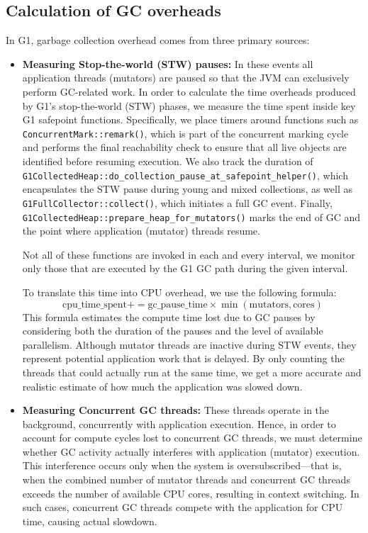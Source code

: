 \subsection{Calculation of GC overheads}
In G1, garbage collection overhead comes from three primary sources:

\begin{itemize}
  \item \textbf{Measuring Stop-the-world (STW) pauses:} In these events
  all application threads (mutators) are paused so that the JVM can exclusively perform 
  GC-related work. In order to calculate the time overheads produced by G1’s stop-the-world (STW) phases, we measure the time spent inside key G1 safepoint functions. 
  Specifically, we place timers around functions such as \texttt{ConcurrentMark::remark()}, which is part of the concurrent marking cycle and performs the final reachability check to ensure that all live objects are identified before resuming execution. 
  We also track the duration of \texttt{G1CollectedHeap::do\allowbreak\_collection\allowbreak\_pause\allowbreak\_at\allowbreak\_safepoint\allowbreak\_helper()}, which encapsulates the STW pause during young and mixed collections, as well as \texttt{G1FullCollector::collect()}, which initiates a full GC event. 
  Finally, \texttt{G1CollectedHeap::prepare\_heap\_for\_mutators()} marks the end of GC and the point where application (mutator) threads resume.

  Not all of these functions are invoked in each and every interval, we monitor only those that are executed by the G1 GC path during the given interval. 

  To translate this time into CPU overhead, we use the following formula:
  \[
  \text{cpu\_time\_spent} += \text{gc\_pause\_time} \times \min(\text{mutators}, \text{cores})
  \]
  This formula estimates the compute time lost due to GC pauses by considering both the duration of the pauses and the level of available parallelism. 
  Although mutator threads are inactive during STW events, they represent potential application work that is delayed. 
  By only counting the threads that could actually run at the same time, we get a more accurate and realistic estimate of how much the application was slowed down. 

  \item \textbf{Measuring Concurrent GC threads:} These threads operate in the background,
  concurrently with application execution. 
  Hence, in order to account for compute cycles lost to concurrent GC threads, 
  we must determine whether GC activity actually interferes with 
  application (mutator) execution. This interference occurs only when 
  the system is oversubscribed—that is, when the combined number of 
  mutator threads and concurrent GC threads exceeds the number of available 
  CPU cores, resulting in context switching. In such cases, concurrent GC threads compete with the application 
  for CPU time, causing actual slowdown.


\end{itemize}
